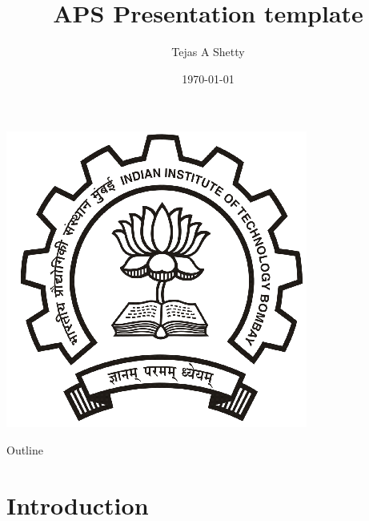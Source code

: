 \documentclass{beamer}
\title[main-aps-template]{APS  Presentation template}
\author{Tejas A Shetty}
\institute{IIT Bombay}
\date{\today}
\begin{document}

\begin{frame}
  \titlepage
\begin{center}
  \includegraphics[scale=0.2]{IITB_logo.png}  \\
\end{center}
\end{frame}



\begin{frame}{Outline}
  \tableofcontents
\end{frame}

\section{Introduction}
\end{document}
